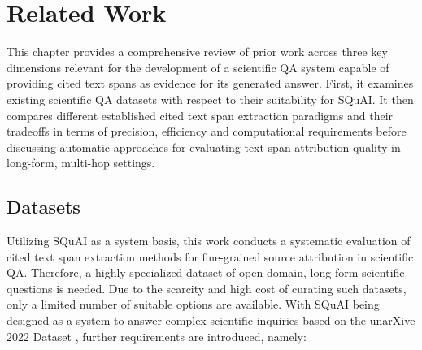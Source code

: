 \chapter{Related Work}
\label{cha:RelatedWork}
This chapter provides a comprehensive review of prior work across three key dimensions relevant for the development of a scientific QA system capable of providing cited text spans as evidence for its generated answer. First, it examines existing scientific QA datasets with respect to their suitability for SQuAI. It then compares different established cited text span extraction paradigms and their tradeoffs in terms of precision, efficiency and computational requirements before discussing automatic approaches for evaluating text span attribution quality in long-form, multi-hop settings. 
\section{Datasets}
Utilizing SQuAI as a system basis, this work conducts a systematic evaluation of cited text span extraction methods for fine-grained source attribution in scientific QA. Therefore, a highly specialized dataset of open-domain, long form scientific questions is needed.  Due to the scarcity and high cost of curating such datasets, only a limited number of suitable options are available. With SQuAI being designed as a system to answer complex scientific inquiries based on the unarXive 2022 Dataset \cite{unarXive2022}, further requirements are introduced, namely: 
